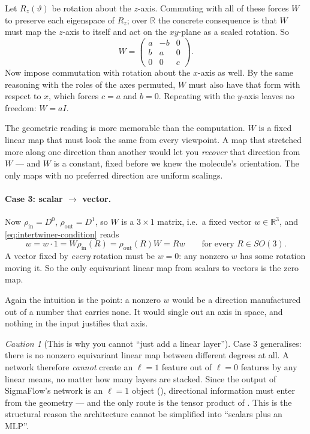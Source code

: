 \documentclass[11pt,a4paper]{report}
\theoremstyle{definition}
\theoremstyle{remark}
\newtheorem{caution}[caution]{Caution}
\newcommand{\RR}{\mathbb R}
\begin{document}
Let $R_z(\vartheta)$ be rotation about the $z$-axis. Commuting with all of
these forces $W$ to preserve each eigenspace of $R_z$; over $\RR$ the
concrete consequence is that $W$ must map the $z$-axis to itself and act on
the $xy$-plane as a scaled rotation. So
\[
W=\begin{pmatrix}a&-b&0\\ b&a&0\\ 0&0&c\end{pmatrix} .
\]
Now impose commutation with rotation about the $x$-axis as well. By the same
reasoning with the roles of the axes permuted, $W$ must also have that form
with respect to $x$, which forces $c=a$ and $b=0$. Repeating with the
$y$-axis leaves no freedom: $W=aI$.

The geometric reading is more memorable than the computation.
$W$ is a fixed linear map that must look the same from every viewpoint. A
map that stretched more along one direction than another would let you
\emph{recover} that direction from $W$ --- and $W$ is a constant, fixed
before we knew the molecule's orientation. The only maps with no preferred
direction are uniform scalings.

\paragraph{Case 3: scalar $\to$ vector.} Now
$\rho_{\mathrm{in}}=D^0$, $\rho_{\mathrm{out}}=D^1$, so $W$ is a
$3\times1$ matrix, i.e.\ a fixed vector $w\in\RR^3$, and
\eqref{eq:intertwiner-condition} reads
\[
w = w\cdot 1 = W\rho_{\mathrm{in}}(R) = \rho_{\mathrm{out}}(R)W = Rw
\qquad\text{for every } R\in SO(3) .
\]
A vector fixed by \emph{every} rotation must be $w=0$: any nonzero $w$ has
some rotation moving it. So the only equivariant linear map from scalars to
vectors is the zero map.

Again the intuition is the point: a nonzero $w$ would be a direction
manufactured out of a number that carries none. It would single out an axis
in space, and nothing in the input justifies that axis.

\begin{caution}[This is why you cannot ``just add a linear layer'']
\label{caution:no-cross-degree-linear}
Case 3 generalises: there is no nonzero equivariant linear map between
different degrees at all. A network therefore \emph{cannot} create an
$\ell=1$ feature out of $\ell=0$ features by any linear means, no matter how
many layers are stacked. Since the output of SigmaFlow's network is an
$\ell=1$ object (), directional
information must enter from the geometry --- and the only route is the
tensor product of . This is the structural reason
the architecture cannot be simplified into ``scalars plus an MLP''.
\end{caution}
\end{document}
